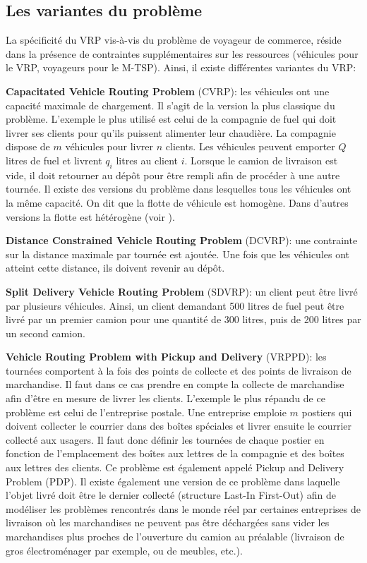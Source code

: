 \subsection{Les variantes du problème}
La spécificité du VRP vis-à-vis du problème de voyageur de commerce, réside dans la présence de contraintes supplémentaires sur les ressources (véhicules pour le VRP, voyageurs pour le M-TSP). Ainsi, il existe différentes variantes du VRP:
\begin{list}{-}{\leftmargin=2em}
  \item \textbf{Capacitated Vehicle Routing Problem} (CVRP): les véhicules ont une capacité maximale de chargement. Il s'agit de la version la plus classique du problème. L'exemple le plus utilisé est celui de la compagnie de fuel qui doit livrer ses clients pour qu'ils puissent alimenter leur chaudière. La compagnie dispose de $m$ véhicules pour livrer $n$ clients. Les véhicules peuvent emporter $Q$ litres de fuel et livrent $q_i$ litres au client $i$. Lorsque le camion de livraison est vide, il doit retourner au dépôt pour être rempli afin de procéder à une autre tournée. Il existe des versions du problème dans lesquelles tous les véhicules ont la même capacité. On dit que la flotte de véhicule est homogène. Dans d'autres versions la flotte est hétérogène (voir \cite{Gendreau1999}).
  
  \item \textbf{Distance Constrained Vehicle Routing Problem} (DCVRP): une contrainte sur la distance maximale par tournée est ajoutée. Une fois que les véhicules ont atteint cette distance, ils doivent revenir au dépôt.
  
  \item \textbf{Split Delivery Vehicle Routing Problem} (SDVRP): un client peut être livré par plusieurs véhicules. Ainsi, un client demandant 500 litres de fuel peut être livré par un premier camion pour une quantité de 300 litres, puis de 200 litres par un second camion.
  
  \item \textbf{Vehicle Routing Problem with Pickup and Delivery} (VRPPD): les tournées comportent à la fois des points de collecte et des points de livraison de marchandise. Il faut dans ce cas prendre en compte la collecte de marchandise afin d'être en mesure de livrer les clients. L'exemple le plus répandu de ce problème est celui de l'entreprise postale. Une entreprise emploie $m$ postiers qui doivent collecter le courrier dans des boîtes spéciales et livrer ensuite le courrier collecté aux usagers. Il faut donc définir les tournées de chaque postier en fonction de l'emplacement des boîtes aux lettres de la compagnie et des boîtes aux lettres des clients. Ce problème est également appelé Pickup and Delivery Problem (PDP). Il existe également une version de ce problème dans laquelle l'objet livré doit être le dernier collecté (structure Last-In First-Out) afin de modéliser les problèmes rencontrés dans le monde réel par certaines entreprises de livraison où les marchandises ne peuvent pas être déchargées 
sans vider les marchandises plus proches de l'ouverture du camion au préalable (livraison de gros électroménager par exemple, ou de meubles, etc.). 
  

\end{list}
